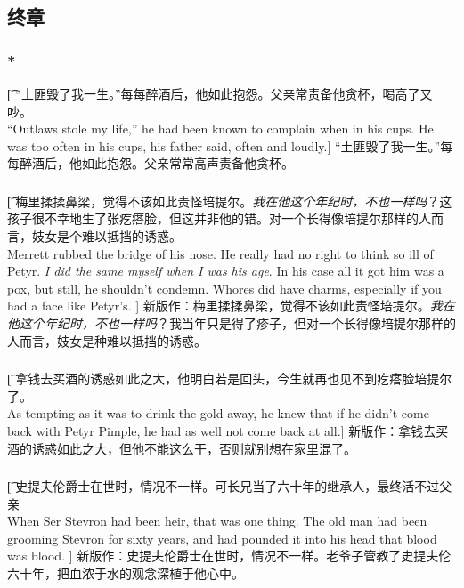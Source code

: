 \documentclass[12pt,a4paper]{article}
\begin{document}
\subsection{终章}
\subsubsection{\color{red}*}\t[
	“土匪毁了我一生。”每每醉酒后，他如此抱怨。父亲常责备他贪杯，喝高了又吵。\\
	“Outlaws stole my life,” he had been known to complain when in his cups. He was too often in his cups, his father said, often and loudly.]
	“土匪毁了我一生。”每每醉酒后，他如此抱怨。父亲常常高声责备他贪杯。
	
\subsubsection{}\t[
	 梅里揉揉鼻梁，觉得不该如此责怪培提尔。\emph{我在他这个年纪时，不也一样吗}？这孩子很不幸地生了张疙瘩脸，但这并非他的错。对一个长得像培提尔那样的人而言，妓女是个难以抵挡的诱惑。\\
	 Merrett rubbed the bridge of his nose. He really had no right to think so ill of Petyr. \emph{I did the same myself when I was his age}. In his case all it got him was a pox, but still, he shouldn't condemn. Whores did have charms, especially if you had a face like Petyr's. ]
	 新版作：梅里揉揉鼻梁，觉得不该如此责怪培提尔。\emph{我在他这个年纪时，不也一样吗}？我当年只是得了疹子，但对一个长得像培提尔那样的人而言，妓女是种难以抵挡的诱惑。
	 
\subsubsection{}\t[
	拿钱去买酒的诱惑如此之大，他明白若是回头，今生就再也见不到疙瘩脸培提尔了。\\
	As tempting as it was to drink the gold away, he knew that if he didn't come back with Petyr Pimple, he had as well not come back at all.]
	新版作：拿钱去买酒的诱惑如此之大，但他不能这么干，否则就别想在家里混了。
	
\subsubsection{}\t[
	史提夫伦爵士在世时，情况不一样。可长兄当了六十年的继承人，最终活不过父亲\\
	When Ser Stevron had been heir, that was one thing. The old man had been grooming Stevron for sixty years, and had pounded it into his head that blood was blood. ]
	新版作：史提夫伦爵士在世时，情况不一样。老爷子管教了史提夫伦六十年，把血浓于水的观念深植于他心中。
	
\end{document}
